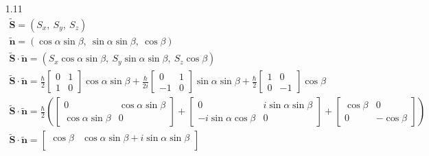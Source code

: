 \documentclass[12pt]{article}
\newcommand{\op}[1]{\tilde{\mathbf{#1}}}
\begin{document}
\begin{enumerate}
\begin{enumerate}
        \end{enumerate}
        \item[1.11]
        \begin{gather*}
            \op{S}=\left(S_x,\ S_y,\ S_z\right)\\
            \op{n}=\left(\cos\alpha\sin\beta,\ \sin\alpha\sin\beta,\ \cos\beta\right)\\
            \op{S}\cdot\op{n}=\left(S_x\cos\alpha\sin\beta,\ S_y\sin\alpha\sin\beta,\ S_z\cos\beta\right)\\
            \op{S}\cdot\op{n}=
            \frac{\hbar}{2}
            \begin{bmatrix}
                0 & 1 \\
                1 & 0
            \end{bmatrix}
            \cos\alpha\sin\beta+
            \frac{\hbar}{2i}
            \begin{bmatrix}
                0  & 1 \\
                -1 & 0
            \end{bmatrix}
            \sin\alpha\sin\beta+
            \frac{\hbar}{2}
            \begin{bmatrix}
                1 & 0  \\
                0 & -1
            \end{bmatrix}
            \cos\beta\\
            \op{S}\cdot\op{n}=
            \frac{\hbar}{2}\left(
            \begin{bmatrix}
                0                   & \cos\alpha\sin\beta \\
                \cos\alpha\sin\beta & 0
            \end{bmatrix}+
            \begin{bmatrix}
                0                     & i\sin\alpha\sin\beta \\
                -i\sin\alpha\cos\beta & 0
            \end{bmatrix}+
            \begin{bmatrix}
                \cos\beta & 0          \\
                0         & -\cos\beta
            \end{bmatrix}
            \right)\\
            \op{S}\cdot\op{n}=
            \begin{bmatrix}
                \cos\beta                                & \cos\alpha\sin\beta      +i\sin\alpha\sin\beta \\

\end{bmatrix}
\end{gather*}
\end{enumerate}
\end{document}
